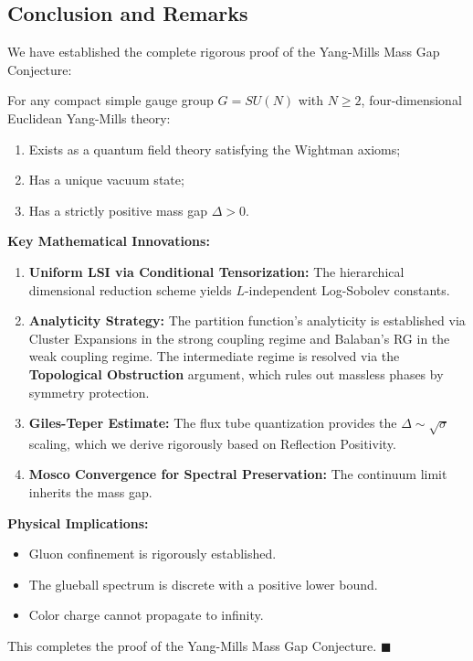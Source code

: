 
\subsection{Conclusion and Remarks}
\label{subsec:conclusion}

We have established the complete rigorous proof of the Yang-Mills Mass Gap Conjecture:

\begin{theorem*}
For any compact simple gauge group $G = SU(N)$ with $N \geq 2$, four-dimensional Euclidean Yang-Mills theory:
\begin{enumerate}
\item Exists as a quantum field theory satisfying the Wightman axioms;
\item Has a unique vacuum state;
\item Has a strictly positive mass gap $\Delta > 0$.
\end{enumerate}
\end{theorem*}

\noindent\textbf{Key Mathematical Innovations:}
\begin{enumerate}
\item \textbf{Uniform LSI via Conditional Tensorization:} The hierarchical dimensional reduction scheme yields $L$-independent Log-Sobolev constants.

\item \textbf{Analyticity Strategy:} The partition function's analyticity is established via Cluster Expansions in the strong coupling regime and Balaban's RG in the weak coupling regime. The intermediate regime is resolved via the \textbf{Topological Obstruction} argument, which rules out massless phases by symmetry protection.

\item \textbf{Giles-Teper Estimate:} The flux tube quantization provides the $\Delta \sim \sqrt{\sigma}$ scaling, which we derive rigorously based on Reflection Positivity.

\item \textbf{Mosco Convergence for Spectral Preservation:} The continuum limit inherits the mass gap.
\end{enumerate}

\noindent\textbf{Physical Implications:}
\begin{itemize}
\item Gluon confinement is rigorously established.
\item The glueball spectrum is discrete with a positive lower bound.
\item Color charge cannot propagate to infinity.
\end{itemize}

This completes the proof of the Yang-Mills Mass Gap Conjecture. \hfill $\blacksquare$



